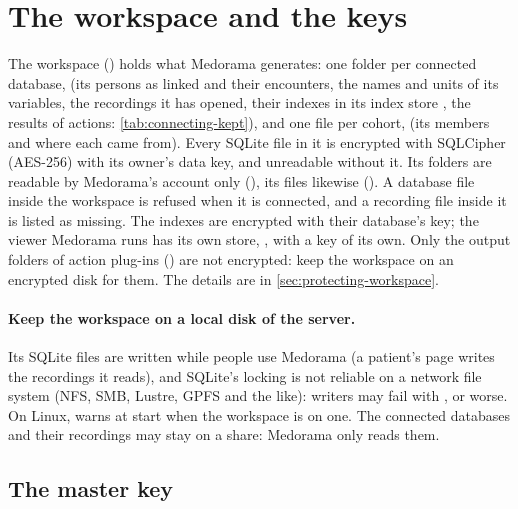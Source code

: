 \section{The workspace and the keys}
\label{sec:administration-workspace}

The workspace () holds what Medorama generates: one folder per connected
database,  (its persons as linked and their encounters, the names and units of
its variables, the recordings it has opened, their indexes in its index store
, the results of actions: \cref{tab:connecting-kept}), and one file per cohort,  (its members and
where each came from). Every SQLite file in it is encrypted with SQLCipher (AES-256) with its
owner's data key, and unreadable without it. Its folders are readable by Medorama's account only
(), its files likewise (). A database file inside the workspace is refused
when it is connected, and a recording file inside it is listed as missing. The indexes are encrypted
with their database's key; the viewer Medorama runs has its own store,
, with a key of its own. Only the output folders of action plug-ins
() are not encrypted: keep the workspace on an encrypted disk for
them. The details are in \cref{sec:protecting-workspace}.

\paragraph{Keep the workspace on a local disk of the server.} Its SQLite files are written while
people use Medorama (a patient's page writes the recordings it reads), and SQLite's locking is not
reliable on a network file system (NFS, SMB, Lustre, GPFS and the like): writers may fail with
, or worse. On Linux,  warns at start when the
workspace is on one. The connected databases and their recordings may stay on a share: Medorama
only reads them.

\subsection{The master key}
\label{sec:administration-keys}

